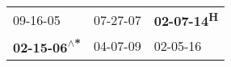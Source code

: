 \begin{supertabular}{lll}
                   09-16-05\textsuperscript{} &  07-27-07\textsuperscript{} &  \textbf{02-07-14\textsuperscript{H}} \\
 \textbf{02-15-06\textsuperscript{$\wedge$*}} &  04-07-09\textsuperscript{} &            02-05-16\textsuperscript{} \\
\end{supertabular}
